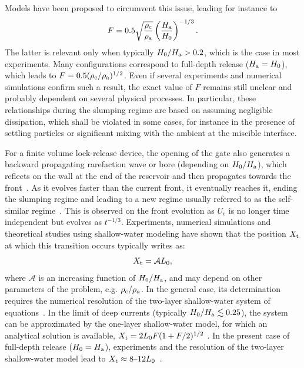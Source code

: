 \documentclass[12pt]{article}
\begin{document}
Models have been proposed to circumvent this issue, leading for instance to \citep{Huppert1980}
\begin{equation}
	\label{eq:Froude_Huppert1980}
	F = 0.5 \sqrt{\frac{\rho_{\text c}}{\rho_{\text a}}}\left(\frac{H_{\text a}}{H_0}\right)^{-1/3}.
\end{equation}
%
The latter is relevant only when typically $H_0/H_{\text a} > 0.2$, which is the case in most experiments. Many configurations correspond to full-depth release ($H_{\text a}=H_0$), which leads to $F = 0.5(\rho_{\text c}/\rho_{\text a})^{1/2}$. Even if several experiments and numerical simulations confirm such a result, the exact value of $F$ remains still unclear and probably dependent on several physical processes. In particular, these relationships during the slumping regime are based on assuming negligible dissipation, which shall be violated in some cases, for instance in the presence of settling particles or significant mixing with the ambient at the miscible interface.

For a finite volume lock-release device, the opening of the gate also generates a backward propagating rarefaction wave or bore (depending on $H_{0}/H_{\rm a}$), which reflects on the wall at the end of the reservoir and then propagates towards the front~\citep[e.g.][]{ungarish2020gravity}. As it evolves faster than the current front, it eventually reaches it, ending the slumping regime and leading to a new regime usually referred to as the self-similar regime~\citep[e.g.][]{Rottman1983, Hogg2006}. This is observed on the front evolution as $U_{\text{c}}$ is no longer time independent but evolves as $t^{-1/3}$.
%
Experiments, numerical simulations and theoretical studies using shallow-water modeling have shown that the position $X_{\text t}$ at which this transition occurs typically writes as:
\begin{equation}
	\label{eq:Xt_inertial}
	\displaystyle X_{\text t} = \mathcal{A} L_{0},
\end{equation}
where $\mathcal{A}$ is an increasing function of $H_{0}/H_{\rm a}$, and may depend on other parameters of the problem, e.g. $\rho_{\rm c}/\rho_{a}$. In the general case, its determination requires the numerical resolution of the two-layer shallow-water system of equations~\citep{Ungarish2005}. In the limit of deep currents (typically $H_{0}/H_{\rm a} \lesssim 0.25$), the system can be approximated by the one-layer shallow-water model, for which an analytical solution is available, $X_{\text t} = 2 L_0 F (1 + F/2)^{1/2}$ \citep{Hogg2006}. In the present case of full-depth release ($H_{0} = H_{\rm a}$), experiments and the resolution of the two-layer shallow-water model lead to $X_{\text t} \approx 8 \text{--} 12 L_{0}$~\citep{Rottman1983, Ungarish2005}.
\end{document}
